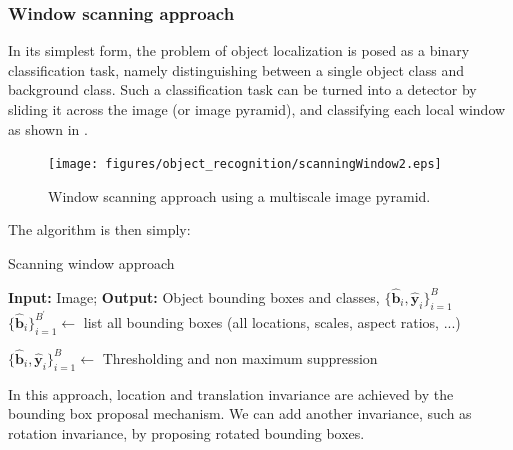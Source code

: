 \subsubsection{Window scanning approach}
In its simplest form, the problem of object localization is posed as a binary classification task, namely distinguishing between a single object class and background class. Such a classification task can be turned into a detector by sliding it across the image (or image pyramid), and classifying each local window as shown in \fig{\ref{fig:scanningWindow2}}.

\begin{figure}[h]
    \centerline{
        \texttt{[image: figures/object\_recognition/scanningWindow2.eps]}
    }
    \caption{Window scanning approach using a multiscale image pyramid.}
    \label{fig:scanningWindow2}
\end{figure}

The algorithm is then simply:
\begin{algorithm}[h]
    \SetAlgoVlined
    \DontPrintSemicolon
    \caption{Scanning window approach}
    \faketablecaption{}
    \label{alg:scanning_window}
    {\bf Input:} Image;
    {\bf Output:} Object bounding boxes and classes, $\{\hat{\mathbf{b}}_i, \hat{\mathbf{y}}_i\}_{i=1}^B$\;
    $\{\hat{\mathbf{b}}_i\}_{i=1}^{B^{\prime}} \leftarrow$ list all bounding boxes (all locations, scales, aspect ratios, ...)\;

    $\{\hat{\mathbf{b}}_i, \hat{\mathbf{y}}_i\}_{i=1}^B \leftarrow$ Thresholding and non maximum suppression\;
    \label{alg:object_localization}
\end{algorithm}

In this approach, location and translation invariance are achieved by the bounding box proposal mechanism. We can add another invariance, such as rotation invariance, by proposing rotated bounding boxes.

